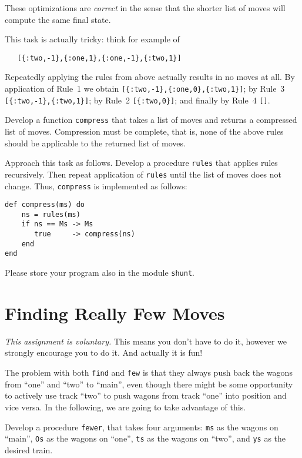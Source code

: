 \documentclass[a4paper,11pt]{article}
\begin{document}
These optimizations are \emph{correct} in the sense that the
shorter list of moves will compute the same final state.

This task is actually tricky: think for example of 
\begin{verbatim}
   [{:two,-1},{:one,1},{:one,-1},{:two,1}]
\end{verbatim}
Repeatedly applying the rules from above actually results in no
moves at all. By application of Rule~1 we obtain
\verb+[{:two,-1},{:one,0},{:two,1}]+;
by Rule~3 
\verb+[{:two,-1},{:two,1}]+;
by Rule~2
\verb+[{:two,0}]+;
and finally by Rule~4
\verb+[]+.

Develop a function \verb+compress+ that takes a list of moves and
returns a compressed list of moves. Compression must be complete,
that is, none of the above rules should be applicable to the
returned list of moves.

Approach this task as follows. Develop a procedure
\verb+rules+ that applies rules recursively. Then repeat
application of \verb+rules+ until the list of moves does not
change. Thus, \verb+compress+ is implemented as follows:
\begin{verbatim}
def compress(ms) do
    ns = rules(ms)
    if ns == Ms -> Ms
       true     -> compress(ns)
    end
end
\end{verbatim}

Please store your program also in the module \verb+shunt+.

\section{Finding Really Few Moves}

\emph{This assignment is voluntary.} This means you don't have to
do it, however we strongly encourage you to do it. And actually
it is fun!

The problem with both \verb+find+ and \verb+few+ is that they
always push back the wagons from ``one'' and ``two'' to ``main'',
even though there might be some opportunity to actively use track
``two'' to push wagons from track ``one'' into position and vice
versa. In the following, we are going to take advantage of this.

Develop a procedure \verb+fewer+, that takes four arguments:
\verb+ms+ as the wagons on ``main'', \verb+Os+ as the wagons on ``one'',
\verb+ts+ as the wagons on ``two'', and \verb+ys+ as the desired train.
\end{document}
